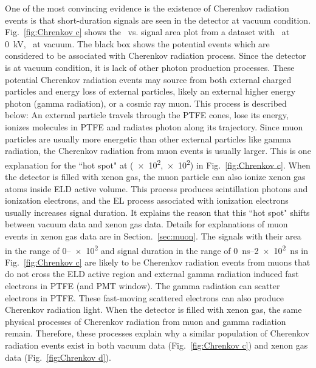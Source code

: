 One of the most convincing evidence is the existence of Cherenkov radiation events is that short-duration signals are seen in the detector at vacuum condition. Fig.~\ref{fig:Chrenkov c} shows the \pud\ vs. signal area plot from a dataset with \opvtvb\ at \SI{0}{\kV}, \opgd\ at vacuum. %
The black box shows the potential events which are considered to be associated with Cherenkov radiation process. Since the detector is at vacuum condition, it is lack of other photon production processes. These potential Cherenkov radiation events may source from both external charged particles and energy loss of external particles, likely an external higher energy photon (gamma radiation), or a cosmic ray muon. This process is described below: An external particle travels through the PTFE cones, lose its energy, ionizes molecules in PTFE and radiates photon along its trajectory. Since muon particles are usually more energetic than other external particles like gamma radiation, the Cherenkov radiation from muon events is usually larger. This is one explanation for the ``hot spot" at (\num{e2},\num{e2}) in Fig.~\ref{fig:Chrenkov c}. When the detector is filled with xenon gas, the muon particle can also ionize xenon gas atoms inside ELD active volume. This process produces scintillation photons and ionization electrons, and the EL process associated with ionization electrons usually increases signal duration. It explains the reason that this ``hot spot" shifts between vacuum data and xenon gas data. Details for explanations of muon events in xenon gas data are in Section.~\ref{sec:muon}. The signals with their area in the range of \SIrange{0}{e2}{\phe} and signal duration in the range of \SIrange{0}{2e2}{\ns} in Fig.~\ref{fig:Chrenkov c} are likely to be Cherenkov radiation events from muons that do not cross the ELD active region and external gamma radiation induced fast electrons in PTFE (and PMT window). The gamma radiation can scatter electrons in PTFE. These fast-moving scattered electrons can also produce Cherenkov radiation light. When the detector is filled with xenon gas, the same physical processes of Cherenkov radiation from muon and gamma radiation remain. Therefore, these processes explain why a similar population of Cherenkov radiation events exist in both vacuum data (Fig.~\ref{fig:Chrenkov c}) and xenon gas data  (Fig.~\ref{fig:Chrenkov d}).

